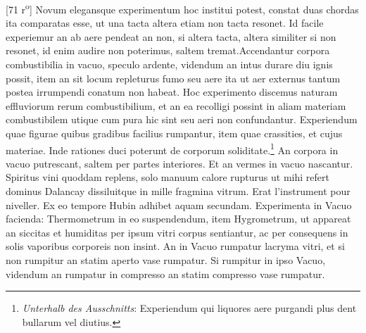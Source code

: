                 \vspace*{8mm}
                \pstart 
                \normalsize
            [71 r\textsuperscript{o}] Novum elegansque experimentum hoc institui potest, constat duas chordas   ita comparatas esse, ut una tacta altera etiam non tacta resonet. Id facile experiemur an ab aere pendeat an non, si altera tacta, altera similiter si non resonet, id enim audire non poterimus, saltem tremat.\pend \pstart Accendantur corpora combustibilia in vacuo, speculo ardente, videndum an intus durare diu ignis possit, item an sit locum repleturus fumo seu aere ita ut aer externus tantum postea irrumpendi conatum\protect{} non habeat. Hoc experimento discemus naturam effluviorum rerum combustibilium, et an ea recolligi possint in aliam materiam combustibilem utique cum pura hic sint seu aeri non confundantur.
            \pend 
            \pstart Experiendum quae figurae quibus gradibus facilius rumpantur, item quae crassities, et cujus materiae. Inde rationes duci poterunt de corporum soliditate.\footnote{\textit{Unterhalb des Ausschnitts}: Experiendum qui liquores\protect{} aere purgandi plus dent bullarum vel diutius.}
            \pend 
            \pstart  An corpora in vacuo putrescant, saltem per partes interiores. Et an vermes in vacuo nascantur. Spiritus vini\protect{}  quoddam replens, solo manuum calore rupturus ut mihi refert dominus Dalancay\protect{} dissiluitque in mille fragmina vitrum. Erat l'instrument pour niveller. Ex eo tempore Hubin\protect{} adhibet aquam secundam.
            \pend 
            \pstart Experimenta in Vacuo facienda: Thermometrum\protect{} in eo suspendendum, item Hygrometrum\protect{}, ut appareat an siccitas et humiditas per ipsum vitri corpus sentiantur, ac per consequens in solis vaporibus corporeis non insint. An in Vacuo rumpatur lacryma vitri, et si non rumpitur an statim aperto vase rumpatur. Si rumpitur in ipso Vacuo, videndum an rumpatur in compresso an statim compresso vase rumpatur.
            \pend 
